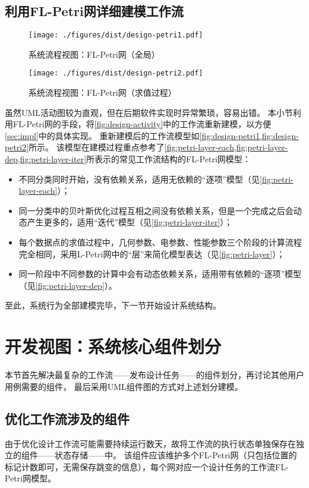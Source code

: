 \documentclass[index]{subfiles}
\begin{document}
\subsection{利用FL-Petri网详细建模工作流}
\begin{figure}[h]
  \centering
  \texttt{[image: ./figures/dist/design-petri1.pdf]}
  \caption{系统流程视图：FL-Petri网（全局）\label{fig:design-petri1}}
\end{figure}
\begin{figure}[h]
  \centering
  \texttt{[image: ./figures/dist/design-petri2.pdf]}
  \caption{系统流程视图：FL-Petri网（求值过程）\label{fig:design-petri2}}
\end{figure}
虽然UML活动图较为直观，但在后期软件实现时异常繁琐，容易出错。
本小节利用FL-Petri网的手段，将\cref{fig:design-activity}中的工作流重新建模，以方便\cref{sec:impl}中的具体实现。
重新建模后的工作流模型如\cref{fig:design-petri1,fig:design-petri2}所示。
该模型在建模过程重点参考了\cref{fig:petri-layer-each,fig:petri-layer-dep,fig:petri-layer-iter}所表示的常见工作流结构的FL-Petri网模型：
\begin{itemize}
  \item 不同分类同时开始，没有依赖关系，适用无依赖的“逐项”模型（见\cref{fig:petri-layer-each}）；
  \item 同一分类中的贝叶斯优化过程互相之间没有依赖关系，但是一个完成之后会动态产生更多的，适用“迭代”模型（见\cref{fig:petri-layer-iter}）；
  \item 每个数据点的求值过程中，几何参数、电参数、性能参数三个阶段的计算流程完全相同，采用L-Petri网中的“层”来简化模型表达（见\cref{fig:petri-layer}）；
  \item 同一阶段中不同参数的计算中会有动态依赖关系，适用带有依赖的“逐项”模型（见\cref{fig:petri-layer-dep}）。
\end{itemize}

至此，系统行为全部建模完毕，下一节开始设计系统结构。

\section{开发视图：系统核心组件划分}\label{sec:design-comp}
本节首先解决最复杂的工作流——发布设计任务——的组件划分，再讨论其他用户用例需要的组件，
最后采用UML组件图的方式对上述划分建模。

\subsection{优化工作流涉及的组件}
由于优化设计工作流可能需要持续运行数天，故将工作流的执行状态单独保存在独立的组件——状态存储——中。
该组件应该维护多个FL-Petri网（只包括位置的标记计数即可，无需保存跳变的信息），每个网对应一个设计任务的工作流FL-Petri网模型。
\end{document}
